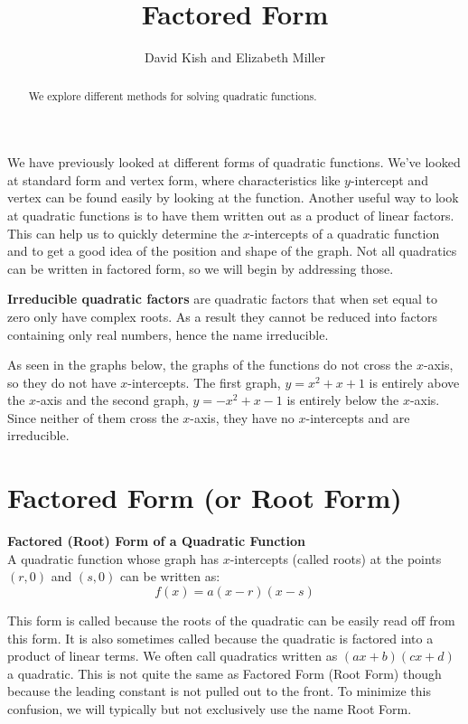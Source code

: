 \documentclass{ximera}
\author{David Kish and Elizabeth Miller}
\title{Factored Form}
\begin{document}
\begin{abstract}
We explore different methods for solving quadratic functions.
\end{abstract}
\maketitle
We have previously looked at different forms of quadratic functions. We've looked at standard form and vertex form, where characteristics like $y$-intercept and vertex can be found easily by looking at the function. Another useful way to look at quadratic functions is to have them written out as a product of linear factors. This can help us to quickly determine the $x$-intercepts of a quadratic function and to get a good idea of the position and shape of the graph. Not all quadratics can be written in factored form, so we will begin by addressing those.
\begin{remark}
\textbf{Irreducible quadratic factors} are quadratic factors that when set equal to zero only have complex roots.  As a result they cannot be reduced into factors containing only real numbers, hence the name irreducible. 
\end{remark}
As seen in the graphs below, the graphs of the functions do not cross the $x$-axis, so they do not have $x$-intercepts. The first graph, $y=x^2+x+1$ is entirely above the $x$-axis and the second graph, $y=-x^2+x-1$ is entirely below the $x$-axis. Since neither of them cross the $x$-axis, they have no $x$-intercepts and are irreducible.

\section{Factored Form (or Root Form)}
\begin{callout} \textbf{\large{Factored (Root) Form of a Quadratic Function}}\\
          A quadratic function whose graph has $x$-intercepts (called roots) at the points $(r,0)$ and $(s,0)$ can be written as:\\
\[
f(x)=a(x-r)(x-s)
\]

\end{callout}

This form is called  because the roots of the quadratic can be easily read off from this form. It is also sometimes called  because the quadratic is factored into a product of linear terms.  We often call quadratics written as $(ax+b)(cx+d)$ a  quadratic.  This is not quite the same as Factored Form (Root Form) though because the leading constant is not pulled out to the front.  To minimize this confusion, we will typically but not exclusively use the name Root Form.
\end{document}
